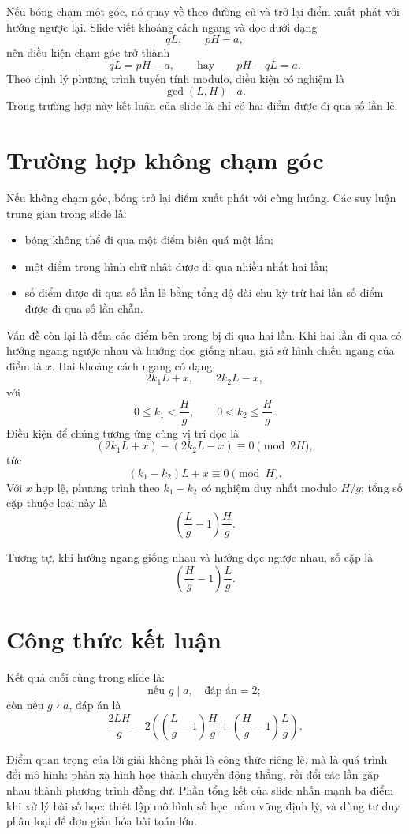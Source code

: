 \documentclass[11pt]{article}
\begin{document}
Nếu bóng chạm một góc, nó quay về theo đường cũ và trở lại điểm xuất phát
với hướng ngược lại. Slide viết khoảng cách ngang và dọc dưới dạng
\[
  qL,\qquad pH-a,
\]
nên điều kiện chạm góc trở thành
\[
  qL=pH-a,\qquad\text{hay}\qquad pH-qL=a.
\]
Theo định lý phương trình tuyến tính modulo, điều kiện có nghiệm là
\[
  \gcd(L,H)\mid a.
\]
Trong trường hợp này kết luận của slide là chỉ có hai điểm được đi qua số
lần lẻ.

\section{Trường hợp không chạm góc}

Nếu không chạm góc, bóng trở lại điểm xuất phát với cùng hướng. Các suy luận
trung gian trong slide là:
\begin{itemize}
  \item bóng không thể đi qua một điểm biên quá một lần;
  \item một điểm trong hình chữ nhật được đi qua nhiều nhất hai lần;
  \item số điểm được đi qua số lần lẻ bằng tổng độ dài chu kỳ trừ hai lần số
  điểm được đi qua số lần chẵn.
\end{itemize}

Vấn đề còn lại là đếm các điểm bên trong bị đi qua hai lần. Khi hai lần đi
qua có hướng ngang ngược nhau và hướng dọc giống nhau, giả sử hình chiếu
ngang của điểm là \(x\). Hai khoảng cách ngang có dạng
\[
  2k_1L+x,\qquad 2k_2L-x,
\]
với
\[
  0\le k_1<\frac Hg,\qquad 0<k_2\le \frac Hg.
\]
Điều kiện để chúng tương ứng cùng vị trí dọc là
\[
  (2k_1L+x)-(2k_2L-x)\equiv 0\pmod {2H},
\]
tức
\[
  (k_1-k_2)L+x\equiv 0\pmod H.
\]
Với \(x\) hợp lệ, phương trình theo \(k_1-k_2\) có nghiệm duy nhất modulo
\(H/g\); tổng số cặp thuộc loại này là
\[
  \left(\frac Lg-1\right)\frac Hg.
\]

Tương tự, khi hướng ngang giống nhau và hướng dọc ngược nhau, số cặp là
\[
  \left(\frac Hg-1\right)\frac Lg.
\]

\section{Công thức kết luận}

Kết quả cuối cùng trong slide là:
\[
  \text{nếu } g\mid a,\quad \text{đáp án}=2;
\]
còn nếu \(g\nmid a\), đáp án là
\[
  \frac{2LH}{g}
  -2\left(
    \left(\frac Lg-1\right)\frac Hg
    +\left(\frac Hg-1\right)\frac Lg
  \right).
\]

Điểm quan trọng của lời giải không phải là công thức riêng lẻ, mà là quá
trình đổi mô hình: phản xạ hình học thành chuyển động thẳng, rồi đổi các lần
gặp nhau thành phương trình đồng dư. Phần tổng kết của slide nhấn mạnh ba
điểm khi xử lý bài số học: thiết lập mô hình số học, nắm vững định lý, và
dùng tư duy phân loại để đơn giản hóa bài toán lớn.
\end{document}

